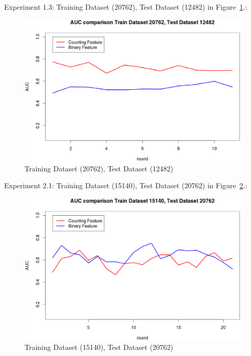 \documentclass{sig-alternate}
\begin{document}
Experiment 1.3: Training Dataset  (20762), Test Dataset  (12482) in Figure~\ref{fig:fig2}.:
\begin{figure}[h]
\centering
\includegraphics[width=\columnwidth]{20762_12482.eps}
\caption{ Training Dataset  (20762), Test Dataset  (12482)}
\label{fig:fig2}
\end{figure}

Experiment 2.1: Training Dataset  (15140), Test Dataset  (20762) in Figure~\ref{fig:fig3}.:
\begin{figure}[h]
\centering
\includegraphics[width=\columnwidth]{15140_20762.eps}
\caption{Training Dataset  (15140), Test Dataset  (20762)}
\label{fig:fig3}
\end{figure}
\end{document}

